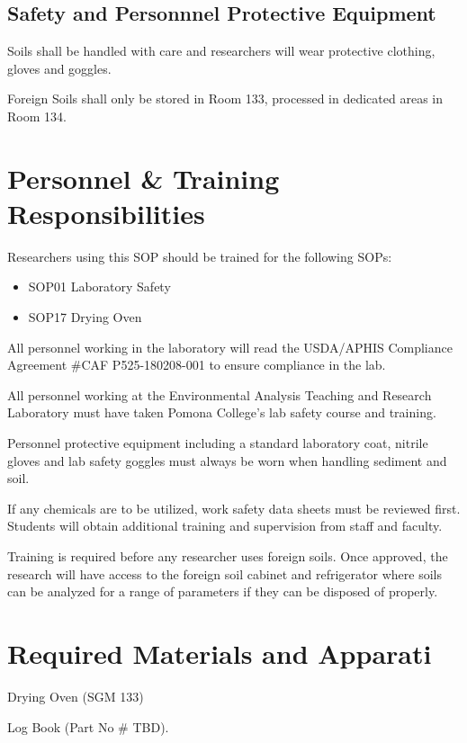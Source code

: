 \documentclass[12pt]{../SOP3}\usepackage[]{graphicx}\usepackage[]{color}
\begin{document}
\subsection{Safety and Personnnel Protective Equipment}

\NP Soils shall be handled with care and researchers will wear protective clothing, gloves and goggles. 

\NP Foreign Soils shall only be stored in Room 133, processed in dedicated areas in Room 134.


\section{Personnel \& Training Responsibilities}

\NP Researchers using this SOP should be trained for the following SOPs:

\begin{itemize}
  \item SOP01 Laboratory Safety
  \item SOP17 Drying Oven
\end{itemize}

\NP All personnel working in the laboratory will read the USDA/APHIS Compliance Agreement \#CAF P525-180208-001 to ensure compliance in the lab.

\NP All personnel working at the Environmental Analysis Teaching and Research Laboratory must have taken Pomona College's lab safety course and training.

\NP Personnel protective equipment including a standard laboratory coat, nitrile gloves and lab safety goggles must always be worn when handling sediment and soil. 

\NP If any chemicals are to be utilized, work safety data sheets must be reviewed first. Students will obtain additional training and supervision from staff and faculty. 

\NP Training is required before any researcher uses foreign soils. Once approved, the research will have access to the foreign soil cabinet and refrigerator where soils can be analyzed for a range of parameters if they can be disposed of properly.  

\section{Required Materials and Apparati}

\NP Drying Oven (SGM 133)

\NP Log Book (Part No \# TBD).
\end{document}
